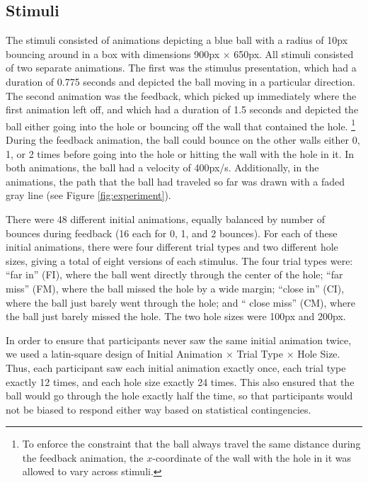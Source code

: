\documentclass[10pt,letterpaper]{article}
\begin{document}
\subsection{Stimuli}

The stimuli consisted of animations depicting a blue ball with a radius of 10px bouncing around in a box with dimensions 900px $\times$ 650px.
All stimuli consisted of two separate animations.
The first was the stimulus presentation, which had a duration of 0.775 seconds and depicted the ball moving in a particular direction.
The second animation was the feedback, which picked up immediately where the first animation left off, and which had a duration of 1.5 seconds and depicted the ball either going into the hole or bouncing off the wall that contained the hole.%
\footnote{To enforce the constraint that the ball always travel the same distance during the feedback animation, the $x$-coordinate of the wall with the hole in it was allowed to vary across stimuli.}
During the feedback animation, the ball could bounce on the other walls either 0, 1, or 2 times before going into the hole or hitting the wall with the hole in it.
In both animations, the ball had a velocity of 400px/s.
Additionally, in the animations, the path that the ball had traveled so far was drawn with a faded gray line (see Figure \ref{fig:experiment}).

There were 48 different initial animations, equally balanced by number of bounces during feedback (16 each for 0, 1, and 2 bounces). 
For each of these initial animations, there were four different trial types and two different hole sizes, giving a total of eight versions of each stimulus. 
The four trial types were: ``far in'' (FI), where the ball went directly through the center of the hole; ``far miss'' (FM), where the ball missed the hole by a wide margin; ``close in'' (CI), where the ball just barely went through the hole; and `` close miss'' (CM), where the ball just barely missed the hole. 
The two hole sizes were 100px and 200px.

In order to ensure that participants never saw the same initial animation twice, we used a latin-square design of Initial Animation $\times$ Trial Type $\times$ Hole Size.
Thus, each participant saw each initial animation exactly once, each trial type exactly 12 times, and each hole size exactly 24 times.
This also ensured that the ball would go through the hole exactly half the time, so that participants would not be biased to respond either way based on statistical contingencies.
\end{document}
